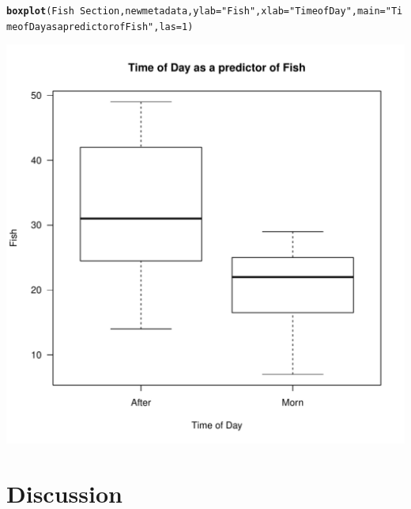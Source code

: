 \documentclass{article}\usepackage[]{graphicx}\usepackage[]{color}
\makeatletter
\def\maxwidth{ %
  \ifdim\Gin@nat@width>\linewidth
    \linewidth
  \else
    \Gin@nat@width
  \fi
}
\newcommand{\hlnum}[1]{\textcolor[rgb]{0.686,0.059,0.569}{#1}}%
\newcommand{\hlstr}[1]{\textcolor[rgb]{0.192,0.494,0.8}{#1}}%
\newcommand{\hlopt}[1]{\textcolor[rgb]{0,0,0}{#1}}%
\newcommand{\hlstd}[1]{\textcolor[rgb]{0.345,0.345,0.345}{#1}}%
\newcommand{\hlkwc}[1]{\textcolor[rgb]{0.333,0.667,0.333}{#1}}%
\newcommand{\hlkwd}[1]{\textcolor[rgb]{0.737,0.353,0.396}{\textbf{#1}}}%
\newenvironment{kframe}{%
 \def\at@end@of@kframe{}%
 \ifinner\ifhmode%
  \def\at@end@of@kframe{\end{minipage}}%
  \begin{minipage}{\columnwidth}%
 \fi\fi%
 \def\FrameCommand##1{\hskip\@totalleftmargin \hskip-\fboxsep
 \colorbox{shadecolor}{##1}\hskip-\fboxsep
     \hskip-\linewidth \hskip-\@totalleftmargin \hskip\columnwidth}%
 \MakeFramed {\advance\hsize-\width
   \@totalleftmargin\z@ \linewidth\hsize
   \@setminipage}}%
 {\par\unskip\endMakeFramed%
 \at@end@of@kframe}
\newenvironment{knitrout}{}{} %
\makeatother
\begin{document}
\begin{knitrout}
\color{fgcolor}\begin{kframe}
\begin{alltt}
\hlkwd{boxplot}\hlstd{(Fish}\hlopt{~}\hlstd{Section,newmetadata,} \hlkwc{ylab}\hlstd{=}\hlstr{"Fish"}\hlstd{,}\hlkwc{xlab}\hlstd{=}\hlstr{"Time of Day"}\hlstd{,}\hlkwc{main} \hlstd{=}\hlstr{"Time of Day as a predictor of Fish"}\hlstd{,}\hlkwc{las}\hlstd{=}\hlnum{1}\hlstd{)}
\end{alltt}
\end{kframe}
\includegraphics[width=\maxwidth]{figure/unnamed-chunk-7-1} 

\end{knitrout}



\section{Discussion}
\end{document}
